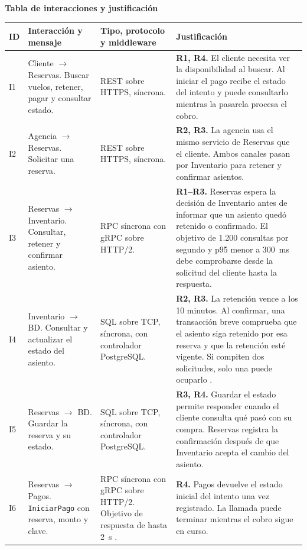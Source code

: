 \documentclass[11pt,a4paper]{article}
\newcommand{\flecha}{\(\to\)}
\begin{document}
{\LARGE\textbf{Tabla de interacciones y justificación}\par}

{\small
\begin{longtable}{@{}P{0.75cm}P{4.25cm}P{4.1cm}P{7.2cm}@{}}
\toprule
\textbf{ID} & \textbf{Interacción y mensaje} & \textbf{Tipo, protocolo y middleware} & \textbf{Justificación} \\
\midrule
\endhead
\bottomrule
\endfoot
I1 & Cliente \flecha{} Reservas. Buscar vuelos, retener, pagar y consultar estado.
& REST sobre HTTPS, síncrona.
& \textbf{R1, R4.} El cliente necesita ver la disponibilidad al buscar. Al iniciar el pago recibe el estado del intento y puede consultarlo mientras la pasarela procesa el cobro. \\
\addlinespace
I2 & Agencia \flecha{} Reservas. Solicitar una reserva.
& REST sobre HTTPS, síncrona.
& \textbf{R2, R3.} La agencia usa el mismo servicio de Reservas que el cliente. Ambos canales pasan por Inventario para retener y confirmar asientos. \\
\addlinespace
I3 & Reservas \flecha{} Inventario. Consultar, retener y confirmar asiento.
& RPC síncrona con gRPC sobre HTTP/2.
& \textbf{R1–R3.} Reservas espera la decisión de Inventario antes de informar que un asiento quedó retenido o confirmado. El objetivo de 1.200 consultas por segundo y p95 menor a 300~ms \cite{enunciado} debe comprobarse desde la solicitud del cliente hasta la respuesta. \\
\addlinespace
I4 & Inventario \flecha{} BD. Consultar y actualizar el estado del asiento.
& SQL sobre TCP, síncrona, con controlador PostgreSQL.
& \textbf{R2, R3.} La retención vence a los 10 minutos. Al confirmar, una transacción breve comprueba que el asiento siga retenido por esa reserva y que la retención esté vigente. Si compiten dos solicitudes, solo una puede ocuparlo \cite[sec. 13.3.2]{postgres}. \\
\addlinespace
I5 & Reservas \flecha{} BD. Guardar la reserva y su estado.
& SQL sobre TCP, síncrona, con controlador PostgreSQL.
& \textbf{R3, R4.} Guardar el estado permite responder cuando el cliente consulta qué pasó con su compra. Reservas registra la confirmación después de que Inventario acepta el cambio del asiento. \\
\addlinespace
I6 & Reservas \flecha{} Pagos. \texttt{IniciarPago} con reserva, monto y clave.
& RPC síncrona con gRPC sobre HTTP/2. Objetivo de respuesta de hasta 2~s \cite{grpc}.
& \textbf{R4.} Pagos devuelve el estado inicial del intento una vez registrado. La llamada puede terminar mientras el cobro sigue en curso. \\

\end{longtable}}
\end{document}
